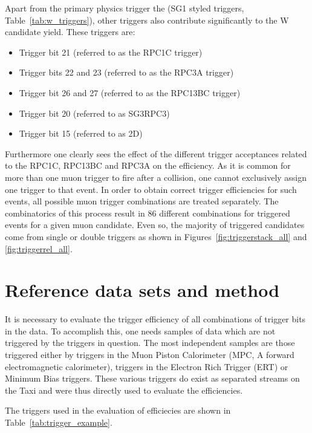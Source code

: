 Apart from the primary physics trigger the (SG1 styled triggers,
Table~\ref{tab:w_triggers}), other triggers also contribute significantly to the
W candidate yield. These triggers are:

\begin{itemize}
  \item Trigger bit 21 (referred to as the RPC1C trigger)
  \item Trigger bits 22 and 23 (referred to as the RPC3A trigger)
  \item Trigger bit 26 and 27 (referred to as the RPC13BC trigger)
  \item Trigger bit 20 (referred to as SG3RPC3)
  \item Trigger bit 15 (referred to as 2D)
\end{itemize}

{\noindent}Furthermore one clearly sees the effect of the different trigger
acceptances related to the RPC1C, RPC13BC and RPC3A on the efficiency. As it is
common for more than one muon trigger to fire after a collision, one cannot
exclusively assign one trigger to that event. In order to obtain correct trigger
efficiencies for such events, all possible muon trigger combinations are treated
separately.  The combinatorics of this process result in 86 different
combinations for triggered events for a given muon candidate. Even so, the
majority of triggered candidates come from single or double triggers as shown in
Figures~\ref{fig:triggerstack_all} and \ref{fig:triggerrel_all}.

\section{Reference data sets and method}
It is necessary to evaluate the trigger efficiency of all combinations of
trigger bits in the data. To accomplish this, one needs samples of data which
are not triggered by the triggers in question. The most independent samples are
those triggered either by triggers in the Muon Piston Calorimeter (MPC, A
forward electromagnetic calorimeter), triggers in the Electron Rich Trigger
(ERT) or Minimum Bias triggers. These various triggers do exist as separated
streams on the Taxi and were thus directly used to evaluate the efficiencies. 

The triggers used in the evaluation of efficiecies are shown in
Table~\ref{tab:trigger_example}.

